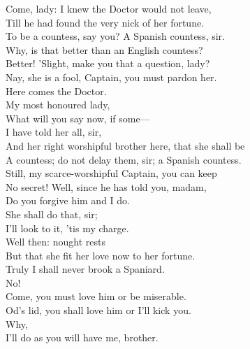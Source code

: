 \documentclass[a4paper,oneside,12pt]{memoir}
\begin{document}
\begin{drama*}
\facespeaks Come, lady: I knew the Doctor would not leave,\\
Till he had found the very nick of her fortune.\\
\kastrilspeaks To be a countess, say you?
\facespeaks {} A Spanish countess, sir.\\
\pliantspeaks Why, is that better than an English countess?\\
\facespeaks Better! 'Slight, make you that a question, lady?\\
\kastrilspeaks Nay, she is a fool, Captain, you must pardon her.\\
\facespeaks Here comes the Doctor.\\
\subtlespeaks {} My most honoured lady,\\
What will you say now, if some---\\
\facespeaks {} I have told her all, sir,\\
And her right worshipful brother here, that she shall be\\
A countess; do not delay them, sir; a Spanish countess.\\
\subtlespeaks Still, my scarce-worshipful Captain, you can keep\\
No secret! Well, since he has told you, madam,\\
Do you forgive him and I do.\\
\kastrilspeaks {} She shall do that, sir;\\
I'll look to it, 'tis my charge.\\
\subtlespeaks {} Well then: nought rests\\
But that she fit her love now to her fortune.\\
\pliantspeaks Truly I shall never brook a Spaniard.\\
\subtlespeaks {} No!\\
Come, you must love him or be miserable.\\
\kastrilspeaks Od's lid, you shall love him or I'll kick you.\\
\pliantspeaks {} Why,\\
I'll do as you will have me, brother.\\

\end{drama*}
\end{document}
